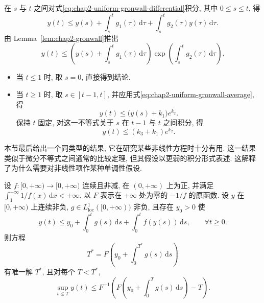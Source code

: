 \begin{Proof}
在 $s$ 与 $t$ 之间对式\eqref{eq:chap2-uniform-gronwall-differential}积分, 其中 $0\leq s\leq t$, 得
\[
 y(t)\leq y(s)+\int_s^t g_1(\tau)\,\mathrm{d}\tau
 +\int_s^t g_2(\tau)y(\tau)\,\mathrm{d}\tau.
\]
由 Lemma~\ref{lem:chap2-gronwall}推出
\[
 y(t)\leq\left(y(s)+\int_s^t g_1(\tau)\,\mathrm{d}\tau\right)
 \exp\left(\int_s^t g_2(\tau)\,\mathrm{d}\tau\right).
\]
\begin{itemize}
\item 当 $t\leq1$ 时, 取 $s=0$, 直接得到结论.
\item 当 $t\geq1$ 时, 取 $s\in[t-1,t]$, 并应用式\eqref{eq:chap2-uniform-gronwall-average}, 得
\[
 y(t)\leq\bigl(y(s)+k_1\bigr)e^{k_2}.
\]
保持 $t$ 固定, 对这一不等式关于 $s$ 在 $t-1$ 与 $t$ 之间积分, 得
\[
 y(t)\leq(k_3+k_1)e^{k_2}.
\]
\end{itemize}
\end{Proof}

本节最后给出一个同类型的结果, 它在研究某些非线性方程时十分有用. 这一结果类似于微分不等式之间通常的比较定理, 但其假设以更弱的积分形式表述. 这解释了为什么需要对非线性项作某种单调性假设.

\begin{Lemma}
\label{lem:chap2-bihari}
设 $f:[0,+\infty)\to[0,+\infty)$ 连续且非减, 在 $(0,+\infty)$ 上为正, 并满足 $\int_1^{+\infty}1/f(x)\,\mathrm{d}x<+\infty$. 以 $F$ 表示在 $+\infty$ 处为零的 $-1/f$ 的原函数. 设 $y$ 在 $[0,+\infty)$ 上连续非负, $g\in L^1_{\mathrm{loc}}([0,+\infty))$ 非负, 且存在 $y_0>0$ 使
\[
 y(t)\leq y_0+\int_0^t g(s)\,\mathrm{d}s+\int_0^t f(y(s))\,\mathrm{d}s,
 \qquad\forall t\geq0.
\]
则方程
\begin{equation}
 T^*=F\left(y_0+\int_0^{T^*}g(s)\,\mathrm{d}s\right)
 \label{eq:chap2-bihari-critical-time}
\end{equation}
有唯一解 $T^*$, 且对每个 $T<T^*$,
\[
 \sup_{t\leq T}y(t)\leq
 F^{-1}\left(F\left(y_0+\int_0^Tg(s)\,\mathrm{d}s\right)-T\right).
\]
\end{Lemma}

